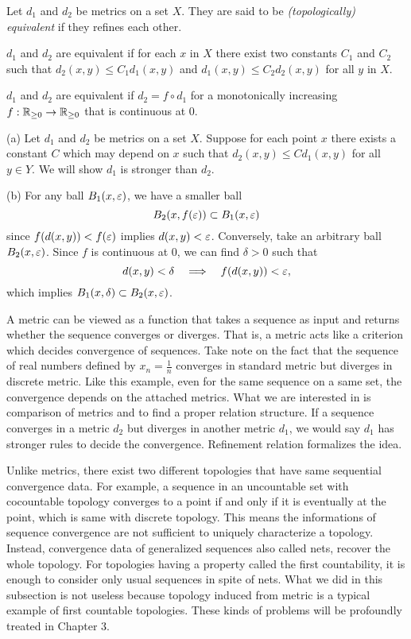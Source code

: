 \documentclass{../../large}
\begin{document}
\begin{prb}
Let $d_1$ and $d_2$ be metrics on a set $X$.
They are said to be \emph{(topologically) equivalent} if they refines each other.
\begin{parts}
\item
$d_1$ and $d_2$ are equivalent if for each $x$ in $X$ there exist two constants $C_1$ and $C_2$ such that $d_2(x,y)\le C_1d_1(x,y)$ and $d_1(x,y)\le C_2d_2(x,y)$ for all $y$ in $X$.
\item
$d_1$ and $d_2$ are equivalent if $d_2=f\circ d_1$ for a monotonically increasing $f:\mathbb{R}_{\ge0}\to\mathbb{R}_{\ge0}$ that is continuous at $0$.
\end{parts}
\end{prb}
\begin{pf}
(a)
Let $d_1$ and $d_2$ be metrics on a set $X$.
Suppose for each point $x$ there exists a constant $C$ which may depend on $x$ such that $d_2(x,y)\le Cd_1(x,y)$ for all $y\in Y$.
We will show $d_1$ is stronger than $d_2$.

(b)
For any ball $B_1(x,\varepsilon)$, we have a smaller ball
\[B_2(x,f(\varepsilon))\subset B_1(x,\varepsilon)\]
since $f(d(x,y))<f(\varepsilon)$ implies $d(x,y)<\varepsilon$.
Conversely, take an arbitrary ball $B_2(x,\varepsilon)$.
Since $f$ is continuous at 0, we can find $\delta>0$ such that
\[d(x,y)<\delta\impl f(d(x,y))<\e,\]
which implies $B_1(x,\delta)\subset B_2(x,\varepsilon)$.
\end{pf}






A metric can be viewed as a function that takes a sequence as input and returns whether the sequence converges or diverges.
That is, a metric acts like a criterion which decides convergence of sequences.
Take note on the fact that the sequence of real numbers defined by $x_n=\frac1n$ converges in standard metric but diverges in discrete metric.
Like this example, even for the same sequence on a same set, the convergence depends on the attached metrics.
What we are interested in is comparison of metrics and to find a proper relation structure.
If a sequence converges in a metric $d_2$ but diverges in another metric $d_1$, we would say $d_1$ has stronger rules to decide the convergence.
Refinement relation formalizes the idea.

Unlike metrics, there exist two different topologies that have same sequential convergence data.
For example, a sequence in an uncountable set with cocountable topology converges to a point if and only if it is eventually at the point, which is same with discrete topology.
This means the informations of sequence convergence are not sufficient to uniquely characterize a topology.
Instead, convergence data of generalized sequences also called nets, recover the whole topology.
For topologies having a property called the first countability, it is enough to consider only usual sequences in spite of nets.
What we did in this subsection is not useless because topology induced from metric is a typical example of first countable topologies.
These kinds of problems will be profoundly treated in Chapter 3.
\end{document}
